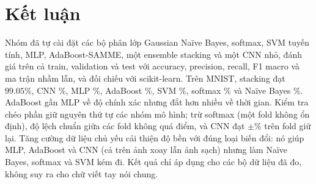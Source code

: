 \section{Kết luận}
\label{sec:conclusion}
Nhóm đã tự cài đặt các bộ phân lớp Gaussian Naïve Bayes, softmax, SVM tuyến tính, MLP, AdaBoost-SAMME, một ensemble stacking và một CNN nhỏ, đánh giá trên cả train, validation và test với accuracy, precision, recall, F1 macro và ma trận nhầm lẫn, và đối chiếu với scikit-learn. Trên MNIST, stacking đạt $99.05\%$, CNN \accTestCNN\%, MLP \accTestMLP\%, AdaBoost \accTestADA\%, SVM \svmTest\%, softmax \accTestSM\% và Naïve Bayes \accTestNB\%. AdaBoost gần MLP về độ chính xác nhưng đắt hơn nhiều về thời gian. Kiểm tra chéo \kfoldK{} phần giữ nguyên thứ tự các nhóm mô hình; trừ softmax (một fold không ổn định), độ lệch chuẩn giữa các fold không quá \kfValSdMLP{} điểm, và CNN đạt \kfValCNN$\pm$\kfValSdCNN\% trên fold giữ lại. Tăng cường dữ liệu chủ yếu cải thiện độ bền với đúng loại biến đổi: nó giúp MLP, AdaBoost và CNN (cả trên ảnh xoay lẫn ảnh sạch) nhưng làm Naïve Bayes, softmax và SVM kém đi. Kết quả chỉ áp dụng cho các bộ dữ liệu đã đo, không suy ra cho chữ viết tay nói chung.

